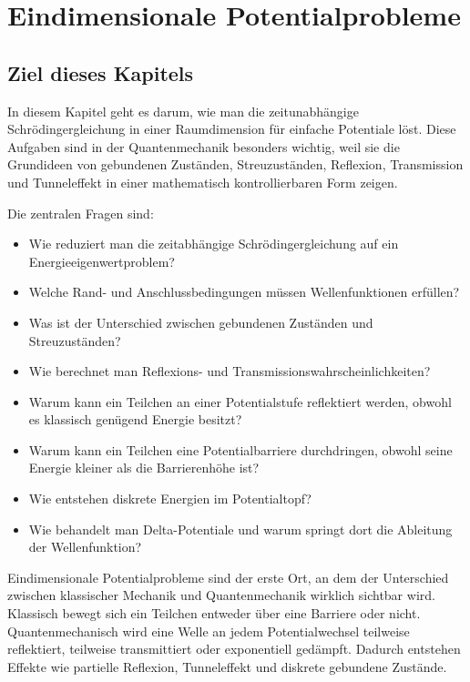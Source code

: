 \chapter{Eindimensionale Potentialprobleme}

\section{Ziel dieses Kapitels}

In diesem Kapitel geht es darum, wie man die zeitunabhängige Schrödingergleichung in einer Raumdimension für einfache Potentiale löst. Diese Aufgaben sind in der Quantenmechanik besonders wichtig, weil sie die Grundideen von gebundenen Zuständen, Streuzuständen, Reflexion, Transmission und Tunneleffekt in einer mathematisch kontrollierbaren Form zeigen.

Die zentralen Fragen sind:
\begin{itemize}
    \item Wie reduziert man die zeitabhängige Schrödingergleichung auf ein Energieeigenwertproblem?
    \item Welche Rand- und Anschlussbedingungen müssen Wellenfunktionen erfüllen?
    \item Was ist der Unterschied zwischen gebundenen Zuständen und Streuzuständen?
    \item Wie berechnet man Reflexions- und Transmissionswahrscheinlichkeiten?
    \item Warum kann ein Teilchen an einer Potentialstufe reflektiert werden, obwohl es klassisch genügend Energie besitzt?
    \item Warum kann ein Teilchen eine Potentialbarriere durchdringen, obwohl seine Energie kleiner als die Barrierenhöhe ist?
    \item Wie entstehen diskrete Energien im Potentialtopf?
    \item Wie behandelt man Delta-Potentiale und warum springt dort die Ableitung der Wellenfunktion?
\end{itemize}

\begin{conceptbox}
Eindimensionale Potentialprobleme sind der erste Ort, an dem der Unterschied zwischen klassischer Mechanik und Quantenmechanik wirklich sichtbar wird. Klassisch bewegt sich ein Teilchen entweder über eine Barriere oder nicht. Quantenmechanisch wird eine Welle an jedem Potentialwechsel teilweise reflektiert, teilweise transmittiert oder exponentiell gedämpft. Dadurch entstehen Effekte wie partielle Reflexion, Tunneleffekt und diskrete gebundene Zustände.
\end{conceptbox}

